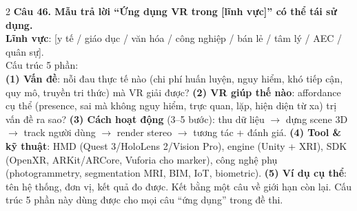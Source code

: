 \begin{paracol}{2}
\textbf{Câu 46. Mẫu trả lời ``Ứng dụng VR trong [lĩnh vực]'' có thể tái sử dụng.}\\
\textbf{Lĩnh vực}: [y tế / giáo dục / văn hóa / công nghiệp / bán lẻ / tâm lý / AEC / quân sự].\\
Cấu trúc 5 phần:\\
\textbf{(1) Vấn đề}: nỗi đau thực tế nào (chi phí huấn luyện, nguy hiểm, khó tiếp cận, quy mô, truyền tri thức) mà VR giải được? \textbf{(2) VR giúp thế nào}: affordance cụ thể (presence, sai mà không nguy hiểm, trực quan, lặp, hiện diện từ xa) trị vấn đề ra sao? \textbf{(3) Cách hoạt động} (3--5 bước): thu dữ liệu $\to$ dựng scene 3D $\to$ track người dùng $\to$ render stereo $\to$ tương tác + đánh giá. \textbf{(4) Tool \& kỹ thuật}: HMD (Quest 3/HoloLens 2/Vision Pro), engine (Unity + XRI), SDK (OpenXR, ARKit/ARCore, Vuforia cho marker), công nghệ phụ (photogrammetry, segmentation MRI, BIM, IoT, biometric). \textbf{(5) Ví dụ cụ thể}: tên hệ thống, đơn vị, kết quả đo được. Kết bằng một câu về giới hạn còn lại. Cấu trúc 5 phần này dùng được cho mọi câu ``ứng dụng'' trong đề thi.

\end{paracol}
